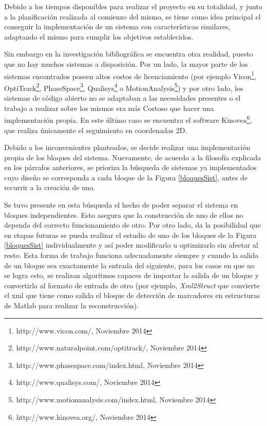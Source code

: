 Debido a los tiempos disponibles para realizar el proyecto en su totalidad, y junto a la planificación realizada al comienzo del mismo, se tiene como idea principal el conseguir la implementación de un sistema con características similares, adaptando el mismo para cumplir los objetivos establecidos. 

Sin embargo en la investigación bibliográfica se encuentra otra realidad, puesto que no hay muchos sistemas a disposición. Por un lado, la mayor parte de los sistemas encontrados poseen altos costos de licenciamiento (por ejemplo Vicon\footnote{http://www.vicon.com/, Noviembre 2014}, OptiTrack\footnote{http://www.naturalpoint.com/optitrack/, Noviembre 2014}, PhaseSpace\footnote{http://www.phasespace.com/index.html, Noviembre 2014}, Qualisys\footnote{http://www.qualisys.com/, Noviembre 2014} o MotionAnalysis\footnote{http://www.motionanalysis.com/index.html, Noviembre 2014}) y por otro lado, los sistemas de código abierto no se adaptaban a las necesidades presentes o el trabajo a realizar sobre los mismos era más Costoso que hacer una implementación propia. En este último caso se encuentra el software Kinovea\footnote{http://www.kinovea.org/, Noviembre 2014}, que realiza únicamente el seguimiento en coordenadas 2D.

Debido a los inconvenientes planteados, se decide realizar una implementación propia de los bloques del sistema. Nuevamente, de acuerdo a la filosofía explicada en los párrafos anteriores, se prioriza la búsqueda de sistemas ya implementados cuyo diseño se corresponda a cada bloque de la Figura \ref{bloquesSist},  antes de recurrir a la creación de uno.

Se tuvo presente en esta búsqueda el hecho de poder separar el sistema en bloques independientes. Esto asegura que la construcción de uno de ellos no dependa del correcto funcionamiento de otro. Por otro lado, da la posibilidad que en etapas futuras se pueda realizar el estudio de uno de los bloques de la Figura \ref{bloquesSist} individualmente y así poder modificarlo u optimizarlo sin afectar al resto. Esta forma de trabajo funciona adecuadamente siempre y cuando la salida de un bloque sea exactamente la entrada del siguiente, para los casos en que no se logra esto, se realizan algoritmos capaces de importar la salida de un bloque y convertirla al formato de entrada de otro (por ejemplo, \textit{Xml2Struct} que convierte el xml que tiene como salida el bloque de detección de marcadores en estructuras de Matlab para realizar la reconstrucción).

